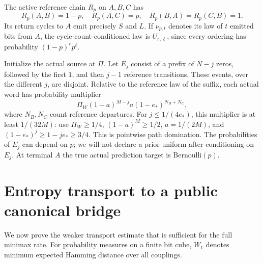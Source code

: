 The active reference chain $R_p$ on $A,B,C$ has
\[
 R_p(A,B)=1-p,\quad R_p(A,C)=p,\quad R_p(B,A)=R_p(C,B)=1.
\]
Its return cycles to $A$ emit precisely $S$ and $L$. If $\nu_{p,t}$ denotes its law of $t$ emitted bits from $A$, the cycle-count-conditioned law is $U_{r,\ell}$, since every ordering has probability $(1-p)^r p^\ell$.

Initialize the actual source at $\Pi$. Let $E_j$ consist of a prefix of $N-j$ zeros, followed by the first $1$, and then $j-1$ reference transitions. These events, over the different $j$, are disjoint. Relative to the reference law of the suffix, each actual word has probability multiplier
\begin{equation}
 \Pi_W(1-a)^{M-j}a(1-e_*)^{N_B+N_C},
 \label{bin:density}
\end{equation}
where $N_B,N_C$ count reference departures. For $j\le1/(4e_*)$, this multiplier is at least $1/(32M)$: use $\Pi_W\ge1/4$, $(1-a)^M\ge1/2$, $a=1/(2M)$, and $(1-e_*)^j\ge1-je_*\ge3/4$. This is pointwise path domination. The probabilities of $E_j$ can depend on $p$; we will not declare a prior uniform after conditioning on $E_j$. At terminal $A$ the true actual prediction target is Bernoulli$(p)$.

\section{Entropy transport to a public canonical bridge}
\label{bin:transport}
We now prove the weaker transport estimate that is sufficient for the full minimax rate. For probability measures on a finite bit cube, $W_1$ denotes minimum expected Hamming distance over all couplings.

